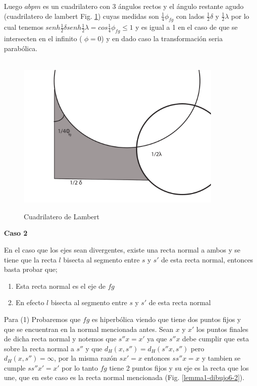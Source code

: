 Luego $abpm$ es un cuadrilatero con 3 \'angulos rectos y el \'angulo
restante agudo (cuadrilatero de lambert Fig. \ref{lemma1-dibujo5}) cuyas medidas son
$\frac{1}{4} \phi_{fg}$ con lados $\frac{1}{2} \delta$ y $
\frac{1}{2} \lambda$ por lo cual tenemos $senh \frac{1}{2} \delta
senh \frac{1}{2} \lambda = cos \frac{1}{4} \phi_{fg} \leq 1$ y es
igual a 1 en el caso de que se intersecten en el infinito ( $\phi
=0$) y en dado caso la transformaci\'on seria parab\'olica. \\ \\

\begin{figure}[h]
  \centering
  \includegraphics[width=10cm]{lemma1-dibujo5}\\
  \caption{Cuadrilatero de Lambert}  \label{lemma1-dibujo5}
\end{figure}



\textbf{Caso 2}


En el caso que los ejes sean divergentes, existe una recta normal a
ambos  y se tiene que la recta $l$ bisecta al segmento entre $s$ y
$s'$ de esta recta normal, entonces basta probar que;

\begin{enumerate}
\item Esta recta normal es el eje de $fg$
\item En efecto $l$ bisecta al segmento entre $s$ y $s'$ de esta
recta normal
\end{enumerate}

Para (1) Probaremos que $fg$ es hiperb\'olica viendo que tiene dos
puntos fijos y que se encuentran en la normal mencionada antes. Sean
$x$ y $x' $ los puntos finales de dicha recta normal y notemos que
$s''x=x'$ ya que $s''x$ debe cumplir que esta sobre la recta normal
a $s''$ y que $d_{H}(x,s'')=d_{H}(s''x,s'')$ pero $d_{H}(x,s'') =
\infty$, por la misma raz\'on $sx'=x$ entonces $ss''x=x$ y tambien
se cumple $ss''x'=x'$ por lo tanto $fg$ tiene 2 puntos fijos y su
eje es la recta que los une, que en este caso es la recta normal
mencionada (Fig. \ref{lemma1-dibujo6-2}).

